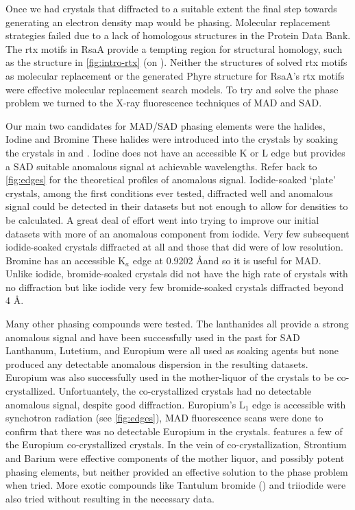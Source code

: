 Once we had crystals that diffracted to a suitable extent the final step towards generating an electron density map would be phasing. Molecular replacement strategies failed due to a lack of homologous structures in the Protein Data Bank. The \ac{rtx}  motifs in RsaA provide a tempting region for structural homology, such as the structure in \cref{fig:intro-rtx} (on ). Neither the structures of solved \ac{rtx} motifs as molecular replacement  or the generated Phyre structure for RsaA's \ac{rtx} motifs were effective molecular replacement search models. To try and solve the phase problem we turned to the X-ray fluorescence techniques of \ac{MAD} and \ac{SAD}. 

Our main two candidates for \ac{MAD}/\ac{SAD} phasing elements were the halides, Iodine and  Bromine These halides were introduced into the crystals by soaking the crystals in  and . Iodine does not have an accessible K or L edge but provides a \ac{SAD}  suitable anomalous signal at achievable wavelengths. Refer back to \cref{fig:edges} for the theoretical profiles of anomalous signal. Iodide-soaked `plate' crystals, among the first conditions ever tested, diffracted well and anomalous signal could be detected in their datasets but not enough to allow for densities to be calculated. A great deal of effort went into trying to improve our initial datasets with more of an anomalous component from iodide. Very few subsequent iodide-soaked crystals diffracted at all  and those that did were of low resolution. Bromine has an accessible K$_{a}$ edge at 0.9202 \AA and so it is useful for \ac{MAD}. Unlike iodide, bromide-soaked crystals did not have the high rate of crystals  with no diffraction but like iodide very few bromide-soaked crystals diffracted beyond 4 \AA{}. 

Many other phasing compounds were tested. The lanthanides all provide a strong  anomalous signal and have been successfully used in the past for \ac{SAD} Lanthanum, Lutetium, and Europium were all used as soaking agents but none produced any detectable anomalous dispersion in the resulting datasets. Europium was also successfully used in the mother-liquor of the crystals to be co-crystallized. Unfortuantely, the co-crystallized crystals had no detectable anomalous signal, despite good diffraction. Europium's L$_{1}$ edge is accessible with synchotron radiation (see \cref{fig:edges}), \ac{MAD} fluorescence scans were done to confirm that there was no detectable Europium in the crystals.  features a few of the Europium co-crystallized crystals. In the vein of co-crystallization, Strontium and Barium were effective components of the mother liquor, and possibly potent phasing elements, but neither provided an effective solution to the phase problem when tried. More exotic compounds like Tantulum bromide () and  triiodide were also tried without resulting in the necessary data. 
 
